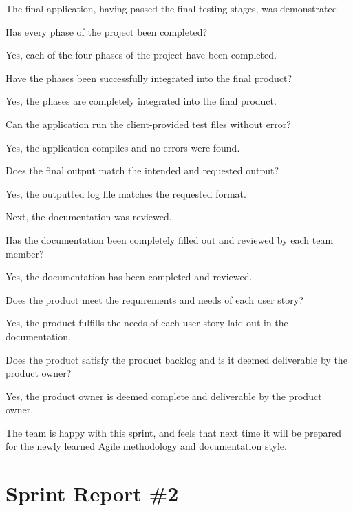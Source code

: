 The final application, having passed the final testing stages, was demonstrated.  \\
\begin{description}
\item [$\bullet$] Has every phase of the project been completed? 
\item Yes, each of the four phases of the project have been completed.
\item [$\bullet$]Have the phases been successfully integrated into the final product?
\item Yes, the phases are completely integrated into the final product.
\item [$\bullet$] Can the application run the client-provided test files without error?
\item Yes, the application compiles and no errors were found.
\item [$\bullet$] Does the final output match the intended and requested output?
\item Yes, the outputted log file matches the requested format.\\

\item Next, the documentation was reviewed. \\

\item [$\bullet$] Has the documentation been completely filled out and reviewed by each team member?
\item Yes, the documentation has been completed and reviewed. 
\item [$\bullet$] Does the product meet the requirements and needs of each user story?
\item Yes, the product fulfills the needs of each user story laid out in the documentation.
\item [$\bullet$] Does the product satisfy the product backlog and is it deemed deliverable by the product owner?
\item Yes, the product owner is deemed complete and deliverable by the product owner.\\

\item The team is happy with this sprint, and feels that next time it will be prepared for the newly learned Agile methodology and documentation style.\\
\end{description}

\section{Sprint Report \#2}

